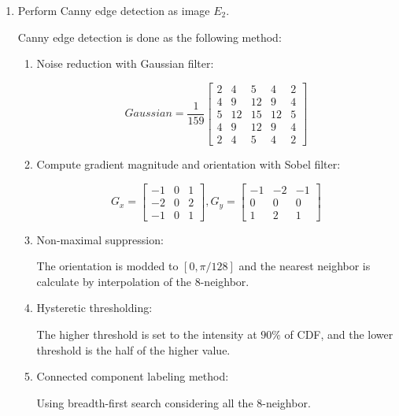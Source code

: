 \documentclass[12pt,a4paper,notitlepage,oneside,amsmath,amssymb]{article}
\begin{document}
\begin{CJK*}{UTF8}{bkai}
\begin{enumerate}[label=(\alph*)]
		\item Perform Canny edge detection as image \(E_2\).

    Canny edge detection is done as the following method:

    \begin{enumerate}
      \item Noise reduction with Gaussian filter:

      \[
        Gaussian =
            \frac{1}{159}
            \begin{bmatrix}
				      2 & 4 & 5 & 4 & 2 \\
				      4 & 9 & 12 & 9 & 4 \\
              5 & 12 & 15 & 12 & 5 \\
				      4 & 9 & 12 & 9 & 4 \\
              2 & 4 & 5 & 4 & 2
            \end{bmatrix}
            \]

      \item Compute gradient magnitude and orientation with Sobel filter:

      \[
        G_x =
			      \begin{bmatrix}
				      -1 & 0 & 1 \\
				      -2 & 0 & 2 \\
				      -1 & 0 & 1
            \end{bmatrix},
            G_y =
			      \begin{bmatrix}
				      -1 & -2 & -1 \\
				      0 & 0 & 0 \\
				      1 & 2 & 1
            \end{bmatrix}
            \]

      \item Non-maximal suppression:

      The orientation is modded to \([0, \pi / 128 ]\) and the nearest neighbor is calculate by interpolation of the 8-neighbor.

      \item Hysteretic thresholding:

      The higher threshold is set to the intensity at \(90\%\) of CDF, and the lower threshold is the half of the higher value.

      \item Connected component labeling method:

      Using breadth-first search considering all the 8-neighbor.


\end{enumerate}
\end{enumerate}
\end{CJK*}
\end{document}
